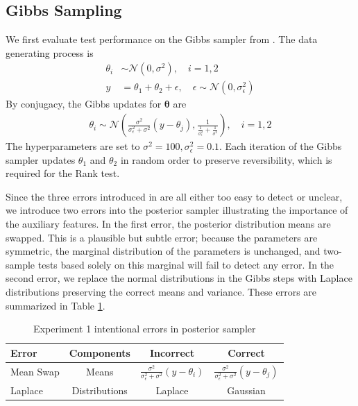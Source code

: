 \documentclass[a4paper,11pt]{article}
\begin{document}
\subsection{Gibbs Sampling}
We first evaluate test performance on the Gibbs sampler from \cite{gandy_unit_2020}. The data generating process is
\begin{align}
    \theta_i &\sim \mathcal{N}(0, \sigma^2), \quad i=1,2 \\
    y &= \theta_1 + \theta_2 + \epsilon, \quad \epsilon \sim \mathcal{N}(0, \sigma_\epsilon^2)
\end{align}
By conjugacy, the Gibbs updates for $\mathbf{\theta}$ are
\begin{align}
\theta_{i} \sim \mathcal{N}\left(
\frac{\sigma^{2}}{\sigma_{\epsilon}^{2}+\sigma^{2}}\left(y-\theta_{j}\right)
, \frac{1}{\frac{1}{\sigma_{\epsilon}^{2}}+\frac{1}{\sigma^{2}}}\right), \quad i=1,2
\end{align}
The hyperparameters are set to $\sigma^{2}=100, \sigma_{\epsilon}^{2}=0.1$. Each iteration of the Gibbs sampler updates $\theta_{1}$ and $\theta_{2}$ in random order to preserve reversibility, which is required for the Rank test.

Since the three errors introduced in \cite{gandy_unit_2020} are all either too easy to detect or unclear, we introduce two errors into the posterior sampler illustrating the importance of the auxiliary features. In the first error, the posterior distribution means are swapped. This is a plausible but subtle error; because the parameters are symmetric, the marginal distribution of the parameters is unchanged, and two-sample tests based solely on this marginal will fail to detect any error. In the second error, we replace the normal distributions in the Gibbs steps with Laplace distributions preserving the correct means and variance. These errors are summarized in Table \ref{tab:ex1_errors}.

\begin{table}[H]
    \centering
    \begin{tabular}{l|c|c|c}
         Error  & Components & Incorrect & Correct \\
         \hline
         Mean Swap & Means &  $\frac{\sigma^{2}}{\sigma_{\epsilon}^{2}+\sigma^{2}}\left(y-\theta_{i}\right)$ & $\frac{\sigma^{2}}{\sigma_{\epsilon}^{2}+\sigma^{2}}\left(y-\theta_{j}\right)$\\
         Laplace & Distributions & Laplace & Gaussian \\
    \end{tabular}
    \caption{Experiment 1 intentional errors in posterior sampler}
    \label{tab:ex1_errors}
\end{table}
\end{document}
